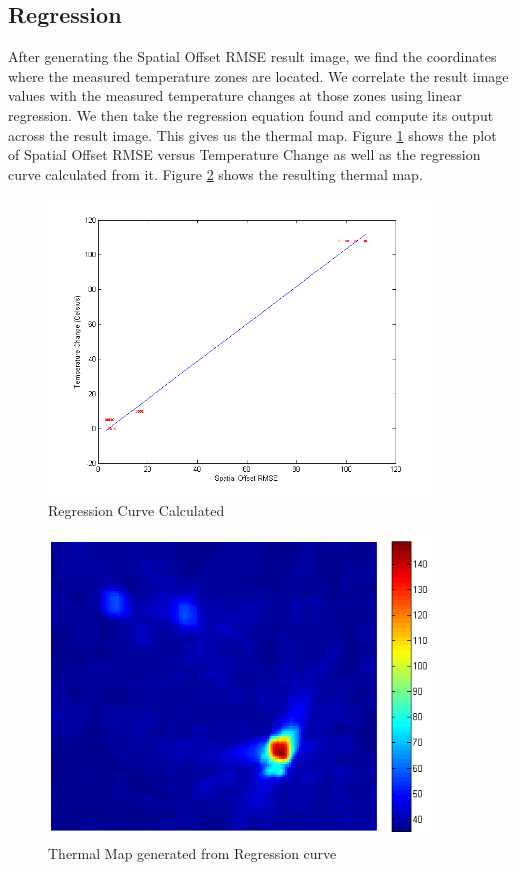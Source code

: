 \documentclass[]{spie}  %
\begin{document}
\subsection{Regression}

After generating the Spatial Offset RMSE result image, we find the coordinates where the measured temperature zones are located. We correlate the result image values with the measured temperature changes at those zones using linear regression. We then take the regression equation found and compute its output across the result image. This gives us the thermal map. Figure \ref{RegressionCurve} shows the plot of Spatial Offset RMSE versus Temperature Change as well as the regression curve calculated from it. Figure \ref{ThermalMap} shows the resulting thermal map.

\begin{figure} 
\centering 
\includegraphics[width=4in]{slidingDiffRegression.png} 
\caption{Regression Curve Calculated} 
\label{RegressionCurve}
\end{figure}

\begin{figure} 
\centering 
\includegraphics[width=4in]{slidingDiffThermalMap.png} 
\caption{Thermal Map generated from Regression curve} 
\label{ThermalMap}
\end{figure}
\end{document}
